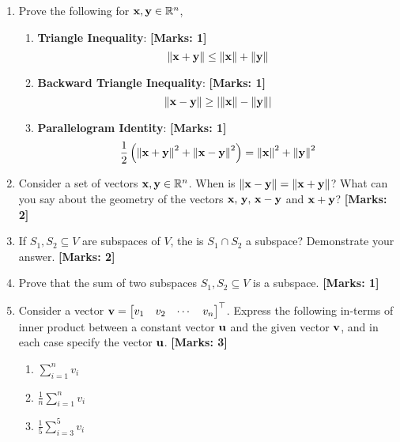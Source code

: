 \documentclass[12pt]{article}
\def\mf{\ensuremath\mathbf}
\begin{document}
\begin{enumerate}
    \item Prove the following for $\mf{x}, \mf{y} \in \mathbb{R}^n$,
    \begin{enumerate}
        \item {\small \textbf{Triangle Inequality}}: \textbf{[Marks: 1]}
        \[ \left\lVert \mf{x} + \mf{y}\right\rVert \leq \left\lVert \mf{x}\right\rVert + \left\lVert \mf{y}\right\rVert \]
        \item {\small \textbf{Backward Triangle Inequality}}: \textbf{[Marks: 1]}
        \[ \left\lVert \mf{x} - \mf{y}\right\rVert  \geq \left\lvert \left\lVert \mf{x}\right\rVert - \left\lVert \mf{y}\right\rVert \right\rvert \]
        \item {\small \textbf{Parallelogram Identity}}: \textbf{[Marks: 1]}
        \[ \frac{1}{2} \left(\left\lVert \mf{x} + \mf{y}\right\rVert^2 + \left\lVert \mf{x} - \mf{y}\right\rVert^2 \right) = \left\lVert \mf{x}\right\rVert^2 + \left\lVert \mf{y}\right\rVert^2 \]
    \end{enumerate}

    \item Consider a set of vectors $\mf{x}, \mf{y} \in \mathbb{R}^n$. When is $\left\lVert \mf{x} - \mf{y} \right\rVert = \left\lVert \mf{x} + \mf{y}\right\rVert$? What can you say about the geometry of the vectors $\mf{x},\,\mf{y},\,\mf{x} - \mf{y}$ and $\mf{x} + \mf{y}$? \textbf{[Marks: 2]}
    
    \item If $S_1, S_2 \subseteq V$ are subspaces of $V$, the is $S_1 \cap S_2$ a subspace? Demonstrate your answer. \textbf{[Marks: 2]}
    
    \item Prove that the sum of two subspaces $S_1, S_2 \subseteq V$ is a subspace. \textbf{[Marks: 1]}
    
    \item Consider a vector $\mf{v} = \begin{bmatrix*}v_1 & v_2 & \cdots & v_n\end{bmatrix*}^\top$. Express the following in-terms of inner product between a constant vector $\mf{u}$ and the given vector $\mf{v}$, and in each case specify the vector $\mf{u}$. \textbf{[Marks: 3]}
    \begin{enumerate}
        \item $\sum_{i=1}^n v_i$
        \item $\frac{1}{n}\sum_{i=1}^n v_i$
        \item $\frac{1}{5}\sum_{i=3}^5 v_i$
    \end{enumerate} 
    

\end{enumerate}
\end{document}
